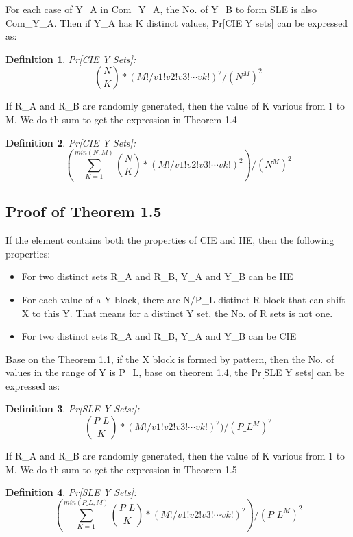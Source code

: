 \documentclass{article}
\newtheorem{defination}{Definition}[section]
\begin{document}
For each case of Y\_A in Com\_Y\_A, the No. of Y\_B to form SLE is also Com\_Y\_A. Then if Y\_A has K distinct values, Pr[CIE Y sets] can be expressed as:
\begin{defination}
Pr[CIE Y Sets]:
\begin{displaymath}
 \binom{N}{K} * (M!/v1!v2!v3! \cdots vk!) ^ 2 /(N^M)^2
\end{displaymath}
\end{defination}
If R\_A and R\_B are randomly generated, then the value of K various from 1 to M. We do th sum to get the expression in Theorem 1.4
\begin{defination}
Pr[CIE Y Sets]:
\begin{displaymath}
(\sum_{K=1}^{min(N,M)} \binom{N}{K} * (M!/v1!v2!v3! \cdots vk!) ^ 2 )/(N^M)^2
\end{displaymath}
\end{defination}

\subsection{Proof of Theorem 1.5}
If the element contains both the properties of CIE and IIE, then the following properties:
\begin{itemize}
	\item For two distinct sets R\_A and R\_B, Y\_A and Y\_B can be IIE
	\item For each value of a Y block, there are N/P\_L distinct R block that can shift X to this Y. That means for a distinct Y set, the No. of R sets is not one.
	\item For two distinct sets R\_A and R\_B, Y\_A and Y\_B can be CIE
\end{itemize}
Base on the Theorem 1.1, if the X block is formed by pattern, then the No. of values in the range of Y is P\_L, base on theorem 1.4, the Pr[SLE Y sets] can be expressed as:
\begin{defination}
Pr[SLE Y Sets:]:
\begin{displaymath}
\binom{P\_L}{K} * (M!/v1!v2!v3! \cdots vk!) ^ 2 )/(P\_L^M)^2
\end{displaymath}
\end{defination}

If R\_A and R\_B are randomly generated, then the value of K various from 1 to M. We do th sum to get the expression in Theorem 1.5
\begin{defination}
Pr[SLE Y Sets]:
\begin{displaymath}
(\sum_{K=1}^{min(P\_L,M)} \binom{P\_L}{K} * (M!/v1!v2!v3! \cdots vk!) ^ 2 )/(P\_L^M)^2
\end{displaymath}
\end{defination}
\end{document}
